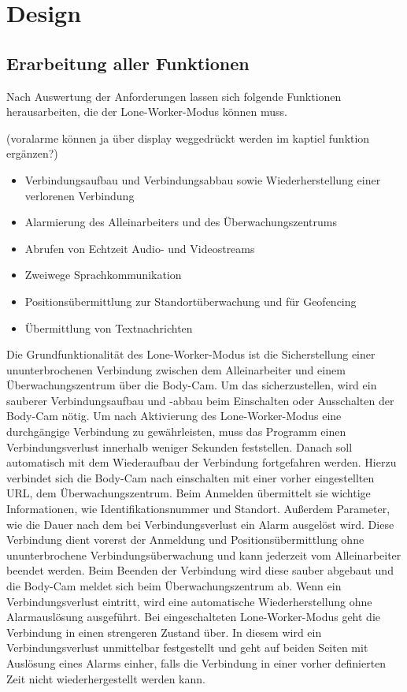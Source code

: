 \documentclass[thesis.tex]{subfiles}
\begin{document}
\chapter{Design}\label{chap:design}

\section{Erarbeitung aller Funktionen}\label{chap:funktionen}
Nach Auswertung der Anforderungen lassen sich folgende Funktionen herausarbeiten, die der Lone-Worker-Modus können muss.

(voralarme können ja über display weggedrückt werden im kaptiel funktion ergänzen?)

\begin{itemize}
    \item Verbindungsaufbau und Verbindungsabbau sowie Wiederherstellung einer verlorenen Verbindung
    \item Alarmierung des Alleinarbeiters und des Überwachungszentrums
    \item Abrufen von Echtzeit Audio- und Videostreams
    \item Zweiwege Sprachkommunikation
    \item Positionsübermittlung zur Standortüberwachung und für Geofencing
    \item Übermittlung von Textnachrichten
\end{itemize}

Die Grundfunktionalität des Lone-Worker-Modus ist die Sicherstellung einer ununterbrochenen Verbindung zwischen dem Alleinarbeiter und einem Überwachungszentrum über die Body-Cam.
Um das sicherzustellen, wird ein sauberer Verbindungsaufbau und -abbau beim Einschalten oder Ausschalten der Body-Cam nötig.
Um nach Aktivierung des Lone-Worker-Modus eine durchgängige Verbindung zu gewährleisten, muss das Programm einen Verbindungsverlust innerhalb weniger Sekunden feststellen.
Danach soll automatisch mit dem Wiederaufbau der Verbindung fortgefahren werden.
Hierzu verbindet sich die Body-Cam nach einschalten mit einer vorher eingestellten URL, dem Überwachungszentrum.
Beim Anmelden übermittelt sie wichtige Informationen, wie Identifikationsnummer und Standort.
Außerdem Parameter, wie die Dauer nach dem bei Verbindungsverlust ein Alarm ausgelöst wird.
Diese Verbindung dient vorerst der Anmeldung und Positionsübermittlung ohne ununterbrochene Verbindungsüberwachung und kann jederzeit vom Alleinarbeiter beendet werden.
Beim Beenden der Verbindung wird diese sauber abgebaut und die Body-Cam meldet sich beim Überwachungszentrum ab.
Wenn ein Verbindungsverlust eintritt, wird eine automatische Wiederherstellung ohne Alarmauslösung ausgeführt.
Bei eingeschalteten Lone-Worker-Modus geht die Verbindung in einen strengeren Zustand über.
In diesem wird ein Verbindungsverlust unmittelbar festgestellt und geht auf beiden Seiten mit Auslösung eines Alarms einher, falls die Verbindung in einer vorher definierten Zeit nicht wiederhergestellt werden kann.
\end{document}
